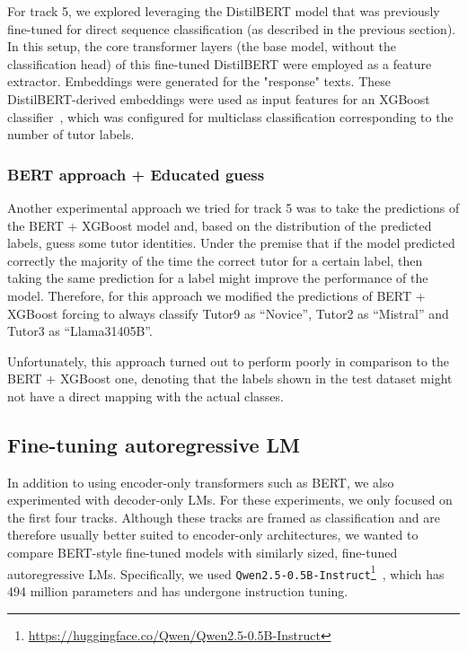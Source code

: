 \documentclass[11pt]{article}
\newcommand{\todo}[1]{\textcolor{blue}{\textbf{\small [TODO: #1]}}}
\begin{document}
For track 5, we explored leveraging the DistilBERT model that was previously fine-tuned for direct sequence classification (as described in the previous section). In this setup, the core transformer layers (the base model, without the classification head) of this fine-tuned DistilBERT were employed as a feature extractor. Embeddings were generated for the "response" texts. These DistilBERT-derived embeddings were used as input features for an XGBoost classifier~\cite{chen2016xgboost}, which was configured for multiclass classification corresponding to the number of tutor labels. 

\subsubsection{BERT approach + Educated guess}
Another experimental approach we tried for track 5 was to take the predictions of the BERT + XGBoost model and, based on the distribution of the predicted labels, guess some tutor identities. Under the premise that if the model predicted correctly the majority of the time the correct tutor for a certain label, then taking the same prediction for a label might improve the performance of the model. 
Therefore, for this approach we modified the predictions of BERT + XGBoost forcing to always classify Tutor9 as ``Novice'', Tutor2 as ``Mistral'' and Tutor3 as ``Llama31405B''.

Unfortunately, this approach turned out to perform poorly in comparison to the BERT + XGBoost one, denoting that the labels shown in the test dataset might not have a direct mapping with the actual classes.

\subsection{Fine-tuning autoregressive LM}
\label{sec:ftllm}

In addition to using encoder-only transformers such as BERT, we also experimented with decoder-only LMs.
For these experiments, we only focused on the first four tracks.
Although these tracks are framed as classification and are therefore usually better suited to encoder-only architectures, we wanted to compare BERT-style fine-tuned models with similarly sized, fine-tuned autoregressive LMs.
Specifically, we used \texttt{Qwen2.5-0.5B-Instruct}\footnote{\url{https://huggingface.co/Qwen/Qwen2.5-0.5B-Instruct}}~\cite{qwen2.5,qwen2}, which has 494 million parameters and has undergone instruction tuning.
\end{document}
